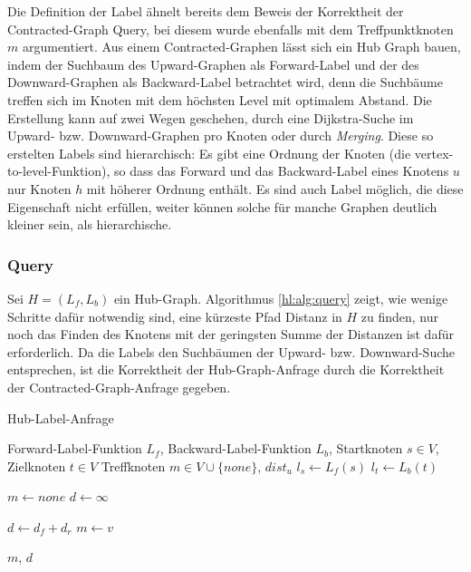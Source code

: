 Die Definition der Label ähnelt bereits dem Beweis der Korrektheit der Contracted-Graph Query, bei diesem wurde ebenfalls mit dem Treffpunktknoten $m$ argumentiert.
Aus einem Contracted-Graphen lässt sich ein Hub Graph bauen, indem der Suchbaum des Upward-Graphen als Forward-Label und der des Downward-Graphen als Backward-Label betrachtet wird, denn die Suchbäume treffen sich im Knoten mit dem höchsten Level mit optimalem Abstand.
Die Erstellung kann auf zwei Wegen geschehen, durch eine Dijkstra-Suche im Upward- bzw. Downward-Graphen pro Knoten oder durch \emph{Merging}.
Diese so erstelten Labels sind hierarchisch: Es gibt eine Ordnung der Knoten (die vertex-to-level-Funktion), so dass das Forward und das Backward-Label eines Knotens $u$ nur Knoten $h$ mit höherer Ordnung enthält.
Es sind auch Label möglich, die diese Eigenschaft nicht erfüllen, weiter können solche für manche Graphen deutlich kleiner sein, als hierarchische.\cite{goldberg2013separating}

\subsubsection{Query}

Sei $H = (L_f, L_b)$ ein Hub-Graph.
Algorithmus \ref{hl:alg:query} zeigt, wie wenige Schritte dafür notwendig sind, eine kürzeste Pfad Distanz in $H$ zu finden, nur noch das Finden des Knotens mit der geringsten Summe der Distanzen ist dafür erforderlich.
Da die Labels den Suchbäumen der Upward- bzw. Downward-Suche entsprechen, ist die Korrektheit der Hub-Graph-Anfrage durch die Korrektheit der Contracted-Graph-Anfrage gegeben.


\begin{algorithm}[ht]
    \caption{Hub-Label-Anfrage}
    \begin{algorithmic}[1]
        \Require Forward-Label-Funktion $L_f$, Backward-Label-Funktion $L_b$, Startknoten $s \in V$, Zielknoten $t \in V$
        \Ensure Treffknoten $m \in V \cup \{ {none} \}$, ${dist}_u$
        \State $l_s \leftarrow L_f (s)$
        \State $l_t \leftarrow L_b (t)$

        \State
        \State $m \leftarrow {none}$
        \State $d \leftarrow \infty$

        \State $d \leftarrow d_f + d_r$
        \State $m \leftarrow v$
        \EndIf
        \EndFor

        \State
        \State \Return $m$, $d$
    \end{algorithmic}
    \label{hl:alg:query}
\end{algorithm}

